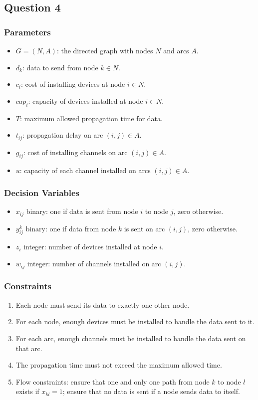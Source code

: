 \subsection*{Question 4}

\subsubsection*{Parameters}

\begin{itemize}
	\item $G = (N, A)$: the directed graph with nodes $N$ and arcs $A$.
	\item $d_k$: data to send from node $k \in N$.
	\item $c_i$: cost of installing devices at node $i \in N$.
	\item $cap_i$: capacity of devices installed at node $i \in N$.
	\item $T$: maximum allowed propagation time for data.
	\item $t_{ij}$: propagation delay on arc $(i, j) \in A$.
	\item $g_{ij}$: cost of installing channels on arc $(i, j) \in A$.
	\item $u$: capacity of each channel installed on arcs $(i, j) \in A$.
\end{itemize}

\subsubsection*{Decision Variables}

\begin{itemize}
	\item $x_{ij}$ binary: one if data is sent from node $i$ to node $j$, zero otherwise.
	\item $y_{ij}^k$ binary: one if data from node $k$ is sent on arc $(i, j)$, zero otherwise.
	\item $z_i$ integer: number of devices installed at node $i$.
	\item $w_{ij}$ integer: number of channels installed on arc $(i, j)$.
\end{itemize}

\subsubsection*{Constraints}

\begin{enumerate}
	\item Each node must send its data to exactly one other node.
	\item For each node, enough devices must be installed to handle the data sent to it.
	\item For each arc, enough channels must be installed to handle the data sent on that arc.
	\item The propagation time must not exceed the maximum allowed time.
	\item Flow constraints: ensure that one and only one path from node $k$ to node $l$ exists if $x_{kl} = 1$; ensure that no data is sent if a node sends data to itself.
\end{enumerate}

